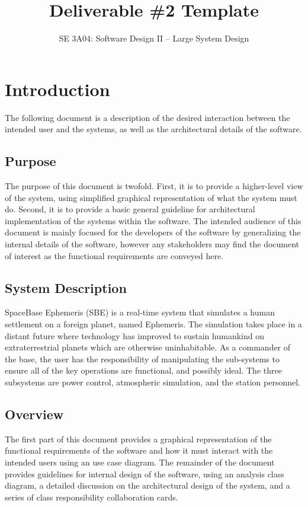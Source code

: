 \documentclass[]{article}
\title{Deliverable \#2 Template}
\author{SE 3A04: Software Design II -- Large System Design}
\date{}
\begin{document}
\maketitle	

\section{Introduction}
\label{sec:introduction}

The following document is a description of the desired interaction between the intended user and the systems, as well as the architectural details of the software. 

\subsection{Purpose}
\label{sub:purpose}
The purpose of this document is twofold. First, it is to provide a higher-level view of the system, using simplified graphical representation of what the system must do. Second, it is to provide a basic general guideline for architectural implementation of the systems within the software. The intended audience of this document is mainly focused for the developers of the software by generalizing the internal details of the software, however any stakeholders may find the document of interest as the functional requirements are conveyed here.

\subsection{System Description}
\label{sub:system_description}
SpaceBase Ephemeris (SBE) is a real-time system that simulates a human settlement on a foreign planet, named Ephemeris.  The simulation takes place in a distant future where technology has improved to sustain humankind on extraterrestrial planets which are otherwise uninhabitable. As a commander of the base, the user has the responsibility of manipulating the sub-systems to ensure all of the key operations are functional, and possibly ideal. The three subsystems are power control, atmospheric simulation, and the station personnel.

\subsection{Overview}
\label{sub:overview}
The first part of this document provides a graphical representation of the functional requirements of the software and how it must interact with the intended users using an use case diagram. The remainder of the document provides guidelines for internal design of the software, using an analysis class diagram, a detailed discussion on the architectural design of the system, and a series of class responsibility collaboration cards. 
\end{document}
